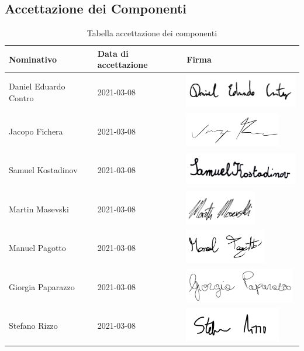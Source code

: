 \documentclass[../piano_di_progetto.tex]{subfiles}
\begin{document}
\newpage
\subsection{Accettazione dei Componenti}%
\label{sub:acc_comp}


\begin{table}[!ht]
	\centering
	\begin{tabular}{|l|l|l|}
		\hline
		\rowcolor{lightgray}
		\textbf{Nominativo} & \textbf{Data di accettazione} & \textbf{Firma} \\ 
		\hline
		Daniel Eduardo Contro & 2021-03-08 & \includegraphics[height=1.5cm]{src/img/firme/firma_dec.png} \\ 
		Jacopo Fichera & 2021-03-08 & \includegraphics[height=1.5cm]{src/img/firme/firma_jf.png} \\ 
		Samuel Kostadinov & 2021-03-08 & \includegraphics[height=1.5cm]{src/img/firme/firma_sk.png} \\
		Martin Masevski & 2021-03-08 & \includegraphics[height=1.5cm]{src/img/firme/firma_mm.png} \\ 
		Manuel Pagotto & 2021-03-08 & \includegraphics[height=1.5cm]{src/img/firme/firma_mp.png}  \\ 
		Giorgia Paparazzo & 2021-03-08 & \includegraphics[height=1.5cm]{src/img/firme/firma_gp.png} \\
		Stefano Rizzo & 2021-03-08 & \includegraphics[height=1.5cm]{src/img/firme/firma_sr.png}  \\ 
		\hline

	\end{tabular}
		\caption{Tabella accettazione dei componenti}
\end{table}
\end{document}
